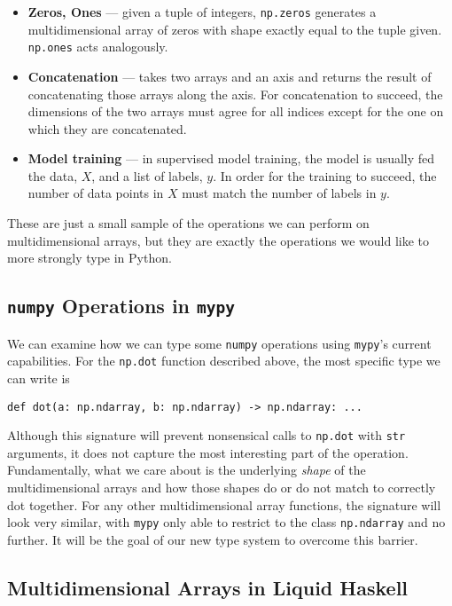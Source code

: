 \documentclass[12pt]{report}
\begin{document}
\begin{itemize}
    \item \textbf{Zeros, Ones} --- given a tuple of integers, \texttt{np.zeros} generates a multidimensional array of zeros with shape exactly equal to the tuple given. \texttt{np.ones} acts analogously.

    \item \textbf{Concatenation} --- takes two arrays and an axis and returns the result of concatenating those arrays along the axis. For concatenation to succeed, the dimensions of the two arrays must agree for all indices except for the one on which they are concatenated.

    \item \textbf{Model training} \cite{sklearn} --- in supervised model training, the model is usually fed the data, $X$, and a list of labels, $y$. In order for the training to succeed, the number of data points in $X$ must match the number of labels in $y$.
\end{itemize}
These are just a small sample of the operations we can perform on multidimensional arrays, but they are exactly the operations we would like to more strongly type in Python.

\subsection{\texttt{numpy} Operations in \texttt{mypy}}

We can examine how we can type some \texttt{numpy} operations using \texttt{mypy}'s current capabilities. For the \texttt{np.dot} function described above, the most specific type we can write is
\begin{center}
    \texttt{def dot(a: np.ndarray, b: np.ndarray) -> np.ndarray: ...}
\end{center}
Although this signature will prevent nonsensical calls to \texttt{np.dot} with \texttt{str} arguments, it does not capture the most interesting part of the operation. Fundamentally, what we care about is the underlying \textit{shape} of the multidimensional arrays and how those shapes do or do not match to correctly dot together. For any other multidimensional array functions, the signature will look very similar, with \texttt{mypy} only able to restrict to the class \texttt{np.ndarray} and no further. It will be the goal of our new type system to overcome this barrier.

\subsection{Multidimensional Arrays in Liquid Haskell}
\end{document}
